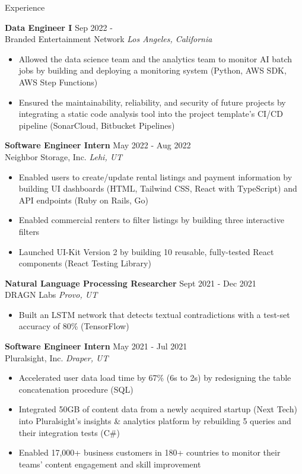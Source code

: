 \documentclass{resume} %
\begin{document}
\begin{rSection}{Experience}

\textbf{Data Engineer I} \hfill Sep 2022 - \\
Branded Entertainment Network \hfill \textit{Los Angeles, California}
\begin{itemize}
   \itemsep -2pt {} 
   \item Allowed the data science team and the analytics team to monitor AI batch jobs by 
   building and deploying a monitoring system (Python, AWS SDK, AWS Step Functions)
   \item Ensured the maintainability, reliability, and security of future projects by 
   integrating a static code analysis tool into the project template's CI/CD pipeline 
   (SonarCloud, Bitbucket Pipelines)
\end{itemize}
 
\textbf{Software Engineer Intern} \hfill May 2022 - Aug 2022\\
Neighbor Storage, Inc. \hfill \textit{Lehi, UT}
 \begin{itemize}
    \itemsep -2pt {} 
    \item Enabled users to create/update rental listings and payment information by building 
    UI dashboards (HTML, Tailwind CSS, React with TypeScript) and API endpoints (Ruby on Rails, 
    Go)
    \item Enabled commercial renters to filter listings by building three interactive filters
    \item Launched UI-Kit Version 2 by building 10 reusable, fully-tested React components 
    (React Testing Library)
 \end{itemize}

\textbf{Natural Language Processing Researcher} \hfill Sept 2021 - Dec 2021\\
DRAGN Labs \hfill \textit{Provo, UT}
 \begin{itemize}
    \itemsep -2pt {} 
    \item Built an LSTM network that detects textual contradictions with a test-set accuracy of 
    80\% (TensorFlow)
 \end{itemize}

\textbf{Software Engineer Intern} \hfill May 2021 - Jul 2021\\
Pluralsight, Inc. \hfill \textit{Draper, UT}
 \begin{itemize}
    \itemsep -2pt {} 
    \item Accelerated user data load time by 67\% (6s to 2s) by redesigning the table 
    concatenation procedure (SQL)
    \item Integrated 50GB of content data from a newly acquired startup (Next Tech) into 
    Pluralsight’s insights \& analytics platform by rebuilding 5 queries and their integration 
    tests (C$\#$)
    \item Enabled 17,000+ business customers in 180+ countries to monitor their teams’ content 
    engagement and skill improvement
 \end{itemize}


\end{rSection}
\end{document}
